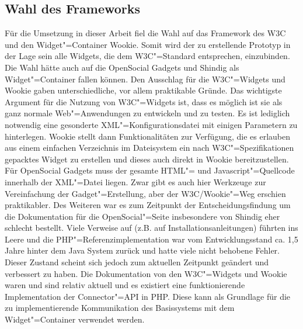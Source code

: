 \subsection{Wahl des Frameworks}
Für die Umsetzung in dieser Arbeit fiel die Wahl auf das Framework des W3C und den Widget"=Container Wookie. Somit wird der zu erstellende Prototyp in der Lage sein alle Widgets, die dem W3C"=Standard entsprechen, einzubinden. Die Wahl hätte auch auf die OpenSocial Gadgets und Shindig als Widget"=Container fallen können. Den Ausschlag für die W3C"=Widgets und Wookie gaben unterschiedliche, vor allem praktikable Gründe. Das wichtigste Argument für die Nutzung von W3C"=Widgets ist, dass es möglich ist sie als ganz normale Web"=Anwendungen zu entwickeln und zu testen. Es ist lediglich notwendig eine gesonderte XML"=Konfigurationsdatei mit einigen Parametern zu hinterlegen. Wookie stellt dann Funktionalitäten zur Verfügung, die es erlauben aus einem einfachen Verzeichnis im Dateisystem ein nach W3C"=Spezifikationen gepacktes Widget zu erstellen und dieses auch direkt in Wookie bereitzustellen. Für OpenSocial Gadgets muss der gesamte HTML"= und Javascript"=Quellcode innerhalb der XML"=Datei liegen. Zwar gibt es auch hier Werkzeuge zur Vereinfachung der Gadget"=Erstellung, aber der W3C/Wookie"=Weg erschien praktikabler. Des Weiteren war es zum Zeitpunkt der Entscheidungsfindung um die Dokumentation für die OpenSocial"=Seite insbesondere von Shindig eher schlecht bestellt. Viele Verweise auf (z.B. auf Installationsanleitungen) führten ins Leere und die PHP"=Referenzimplementation war vom Entwicklungsstand ca. 1,5 Jahre hinter dem Java System zurück und hatte viele nicht behobene Fehler. Dieser Zustand scheint sich jedoch zum aktuellen Zeitpunkt geändert und verbessert zu haben. Die Dokumentation von den W3C"=Widgets und Wookie waren und sind relativ aktuell und es existiert eine funktionierende Implementation der Connector"=API in PHP. Diese kann als Grundlage für die zu implementierende Kommunikation des Basissystems mit dem Widget"=Container verwendet werden.


